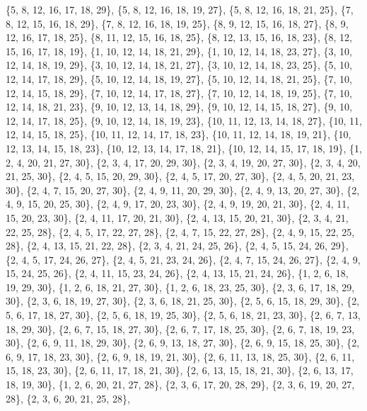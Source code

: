 \documentclass[11pt,a4paper]{article}
\begin{document}
{\{5, 8, 12, 16, 17, 18, 29\}, \{5, 8, 12, 16, 18, 19, 27\}, \{5, 8, 12, 16, 18, 21, 25\}, \{7, 8, 12, 15, 16, 18, 29\}, \{7, 8, 12, 16, 18, 19, 25\},
\{8, 9, 12, 15, 16, 18, 27\}, \{8, 9, 12, 16, 17, 18, 25\}, \{8, 11, 12, 15, 16, 18, 25\}, \{8, 12, 13, 15, 16, 18, 23\}, \{8, 12, 15, 16, 17, 18, 19\},
\{1, 10, 12, 14, 18, 21, 29\}, \{1, 10, 12, 14, 18, 23, 27\}, \{3, 10, 12, 14, 18, 19, 29\}, \{3, 10, 12, 14, 18, 21, 27\}, \{3, 10, 12, 14, 18, 23, 25\},
\{5, 10, 12, 14, 17, 18, 29\}, \{5, 10, 12, 14, 18, 19, 27\}, \{5, 10, 12, 14, 18, 21, 25\}, \{7, 10, 12, 14, 15, 18, 29\}, \{7, 10, 12, 14, 17, 18, 27\},
\{7, 10, 12, 14, 18, 19, 25\}, \{7, 10, 12, 14, 18, 21, 23\}, \{9, 10, 12, 13, 14, 18, 29\}, \{9, 10, 12, 14, 15, 18, 27\}, \{9, 10, 12, 14, 17, 18, 25\},
\{9, 10, 12, 14, 18, 19, 23\}, \{10, 11, 12, 13, 14, 18, 27\}, \{10, 11, 12, 14, 15, 18, 25\}, \{10, 11, 12, 14, 17, 18, 23\}, \{10, 11, 12, 14, 18, 19, 21\},
\{10, 12, 13, 14, 15, 18, 23\}, \{10, 12, 13, 14, 17, 18, 21\}, \{10, 12, 14, 15, 17, 18, 19\}, \{1, 2, 4, 20, 21, 27, 30\}, \{2, 3, 4, 17, 20, 29, 30\},
\{2, 3, 4, 19, 20, 27, 30\}, \{2, 3, 4, 20, 21, 25, 30\}, \{2, 4, 5, 15, 20, 29, 30\}, \{2, 4, 5, 17, 20, 27, 30\}, \{2, 4, 5, 20, 21, 23, 30\},
\{2, 4, 7, 15, 20, 27, 30\}, \{2, 4, 9, 11, 20, 29, 30\}, \{2, 4, 9, 13, 20, 27, 30\}, \{2, 4, 9, 15, 20, 25, 30\}, \{2, 4, 9, 17, 20, 23, 30\},
\{2, 4, 9, 19, 20, 21, 30\}, \{2, 4, 11, 15, 20, 23, 30\}, \{2, 4, 11, 17, 20, 21, 30\}, \{2, 4, 13, 15, 20, 21, 30\}, \{2, 3, 4, 21, 22, 25, 28\},
\{2, 4, 5, 17, 22, 27, 28\}, \{2, 4, 7, 15, 22, 27, 28\}, \{2, 4, 9, 15, 22, 25, 28\}, \{2, 4, 13, 15, 21, 22, 28\}, \{2, 3, 4, 21, 24, 25, 26\},
\{2, 4, 5, 15, 24, 26, 29\}, \{2, 4, 5, 17, 24, 26, 27\}, \{2, 4, 5, 21, 23, 24, 26\}, \{2, 4, 7, 15, 24, 26, 27\}, \{2, 4, 9, 15, 24, 25, 26\},
\{2, 4, 11, 15, 23, 24, 26\}, \{2, 4, 13, 15, 21, 24, 26\}, \{1, 2, 6, 18, 19, 29, 30\}, \{1, 2, 6, 18, 21, 27, 30\}, \{1, 2, 6, 18, 23, 25, 30\},
\{2, 3, 6, 17, 18, 29, 30\}, \{2, 3, 6, 18, 19, 27, 30\}, \{2, 3, 6, 18, 21, 25, 30\}, \{2, 5, 6, 15, 18, 29, 30\}, \{2, 5, 6, 17, 18, 27, 30\},
\{2, 5, 6, 18, 19, 25, 30\}, \{2, 5, 6, 18, 21, 23, 30\}, \{2, 6, 7, 13, 18, 29, 30\}, \{2, 6, 7, 15, 18, 27, 30\}, \{2, 6, 7, 17, 18, 25, 30\},
\{2, 6, 7, 18, 19, 23, 30\}, \{2, 6, 9, 11, 18, 29, 30\}, \{2, 6, 9, 13, 18, 27, 30\}, \{2, 6, 9, 15, 18, 25, 30\}, \{2, 6, 9, 17, 18, 23, 30\},
\{2, 6, 9, 18, 19, 21, 30\}, \{2, 6, 11, 13, 18, 25, 30\}, \{2, 6, 11, 15, 18, 23, 30\}, \{2, 6, 11, 17, 18, 21, 30\}, \{2, 6, 13, 15, 18, 21, 30\},
\{2, 6, 13, 17, 18, 19, 30\}, \{1, 2, 6, 20, 21, 27, 28\}, \{2, 3, 6, 17, 20, 28, 29\}, \{2, 3, 6, 19, 20, 27, 28\}, \{2, 3, 6, 20, 21, 25, 28\},
}
\end{document}
